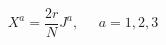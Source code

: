\begin{equation}
X^a = \frac{2r}{ N}  J^a, \;\;\;\;\; a = 1, 2, 3
\label{eq:matrix-sphere}
\end{equation}

